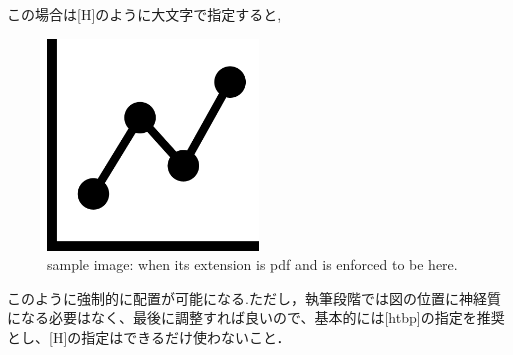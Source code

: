 この場合は[H]のように大文字で指定すると,
\begin{figure}[H]
    \centering   
    \includegraphics[width=0.5\textwidth]{./img/sample_pdf.pdf}
    \caption[sample image (pdf, here)]{sample image: when its extension is pdf and is enforced to be here.}
    \label{Fig:sample_pdf_here}
\end{figure}
このように強制的に配置が可能になる.ただし，執筆段階では図の位置に神経質になる必要はなく、最後に調整すれば良いので、基本的には[htbp]の指定を推奨とし、[H]の指定はできるだけ使わないこと．

